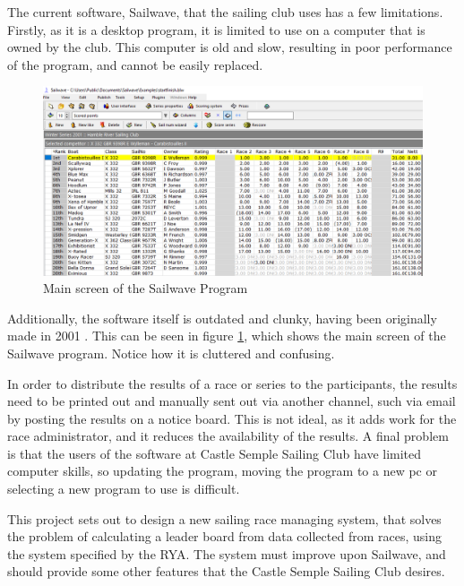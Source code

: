 \documentclass{l4proj}
\begin{document}
The current software, Sailwave, that the sailing club uses has a few limitations. Firstly, as it is a desktop program, it is limited to use on a computer that is owned by the club. This computer is old and slow, resulting in poor performance of the program, and cannot be easily replaced.

\begin{figure}[H]
    \centering
    \includegraphics[width=1\linewidth]{images/Sailwave.png} 

    \caption{Main screen of the Sailwave Program \citep{sailwave}
    }

    \label{fig:Sailwave} 
\end{figure}

Additionally, the software itself is outdated and clunky, having been originally made in 2001 \citep{sailwave}. This can be seen in figure \ref{fig:Sailwave}, which shows the main screen of the Sailwave program. Notice how it is cluttered and confusing. 

In order to distribute the results of a race or series to the participants, the results need to be printed out and manually sent out via another channel, such via email by posting the results on a notice board. This is not ideal, as it adds work for the race administrator, and it reduces the availability of the results. A final problem is that the users of the software at Castle Semple Sailing Club have limited computer skills, so updating the program, moving the program to a new pc or selecting a new program to use is difficult.

This project sets out to design a new sailing race managing system, that solves the problem of calculating a leader board from data collected from races, using the system specified by the RYA. The system must improve upon Sailwave, and should provide some other features that the Castle Semple Sailing Club desires.
\end{document}
